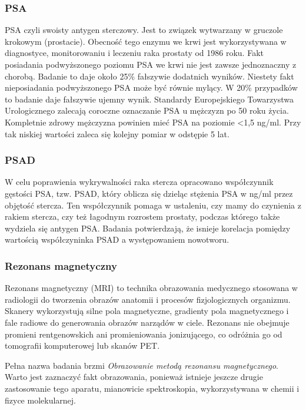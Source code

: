 \documentclass[a4paper,11pt,twoside]{report}
\theoremstyle{definition}
\begin{document}
\subsubsection{PSA}
PSA czyli swoisty antygen sterczowy. Jest to związek wytwarzany w gruczole krokowym (prostacie). Obecność tego enzymu we krwi jest wykorzystywana w diagnostyce, monitorowaniu i leczeniu raka prostaty od 1986 roku. Fakt posiadania podwyższonego poziomu PSA we krwi nie jest zawsze jednoznaczny z chorobą. Badanie to daje około 25\% fałszywie dodatnich wyników. Niestety fakt nieposiadania podwyższonego PSA może być równie mylący. W 20\% przypadków to badanie daje fałszywie ujemny wynik. Standardy Europejskiego Towarzystwa Urologicznego zalecają coroczne oznaczanie PSA u mężczyzn po 50 roku życia. 
Kompletnie zdrowy mężczyzna powinien mieć PSA na poziomie <1,5 ng/ml. Przy tak niskiej wartości zaleca się kolejny pomiar w odstępie 5 lat. 

\subsubsection{PSAD}
W celu poprawienia wykrywalności raka stercza opracowano współczynnik gęstości PSA, tzw.
PSAD, który oblicza się dzieląc stężenia PSA w ng/ml przez objętość stercza. Ten współczynnik pomaga w ustaleniu, czy mamy do czynienia z rakiem stercza, czy też łagodnym rozrostem prostaty, podczas którego także wydziela się antygen PSA. Badania potwierdzają, że isnieje korelacja pomiędzy wartością współczyninka PSAD a występowaniem nowotworu.

\subsubsection{Rezonans magnetyczny}
Rezonans magnetyczny (MRI) to technika obrazowania medycznego stosowana w radiologii do tworzenia obrazów anatomii i procesów fizjologicznych organizmu. Skanery wykorzystują silne pola magnetyczne, gradienty pola magnetycznego i fale radiowe do generowania obrazów narządów w ciele. Rezonans nie obejmuje promieni rentgenowskich ani promieniowania jonizującego, co odróżnia go od tomografii komputerowej lub  skanów PET.
\par
Pełna nazwa badania brzmi \textit{Obrazowanie metodą rezonansu magnetycznego}. Warto jest zaznaczyć fakt obrazowania, ponieważ istnieje jeszcze drugie zastosowanie tego aparatu, mianowicie spektroskopia, wykorzystywana w chemii i fizyce molekularnej. 
\end{document}

